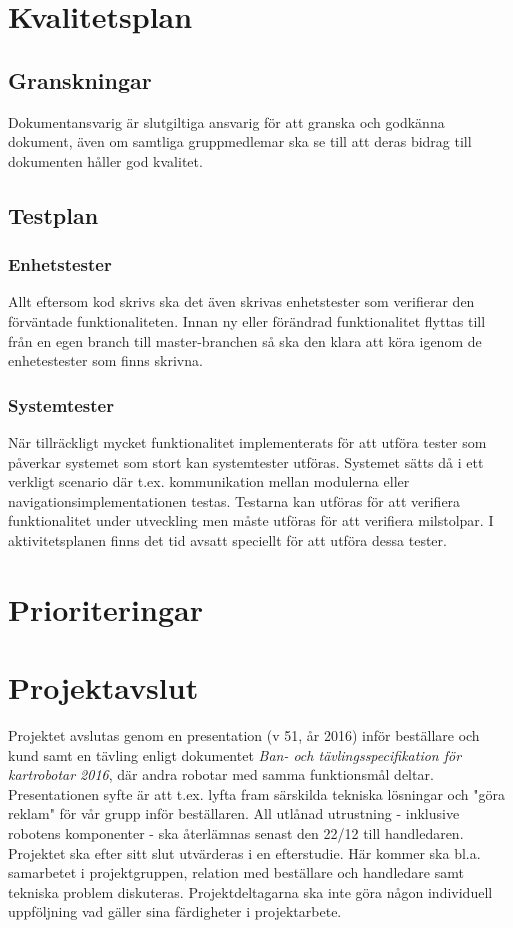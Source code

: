 \documentclass{article}
\begin{document}
\section{Kvalitetsplan}

\subsection{Granskningar}
Dokumentansvarig är slutgiltiga ansvarig för att granska och godkänna dokument, även om samtliga gruppmedlemar ska se till att deras bidrag till dokumenten håller god kvalitet.

\subsection{Testplan}
\subsubsection{Enhetstester}
Allt eftersom kod skrivs ska det även skrivas enhetstester som verifierar den förväntade funktionaliteten. Innan ny eller förändrad funktionalitet flyttas till från en egen branch till master-branchen så ska den klara att köra igenom de enhetestester som finns skrivna.

\subsubsection{Systemtester}
När tillräckligt mycket funktionalitet implementerats för att utföra tester som påverkar systemet som stort kan systemtester utföras. Systemet sätts då i ett verkligt scenario där t.ex. kommunikation mellan modulerna eller navigationsimplementationen testas. Testarna kan utföras för att verifiera funktionalitet under utveckling men måste utföras för att verifiera milstolpar. I aktivitetsplanen finns det tid avsatt speciellt för att utföra dessa tester.

\section{Prioriteringar}
\section{Projektavslut}
Projektet avslutas genom en presentation (v 51, år 2016) inför beställare och kund samt en tävling enligt dokumentet \textit{Ban- och tävlingsspecifikation för kartrobotar 2016}, där andra robotar med samma funktionsmål deltar. Presentationen syfte är att t.ex. lyfta fram särskilda tekniska lösningar och "göra reklam" för vår grupp inför beställaren. All utlånad utrustning - inklusive robotens komponenter - ska återlämnas senast den 22/12 till handledaren. Projektet ska efter sitt slut utvärderas i en efterstudie. Här kommer ska bl.a. samarbetet i projektgruppen, relation med beställare och handledare samt tekniska problem diskuteras. Projektdeltagarna ska inte göra någon individuell uppföljning vad gäller sina färdigheter i projektarbete.
\end{document}
